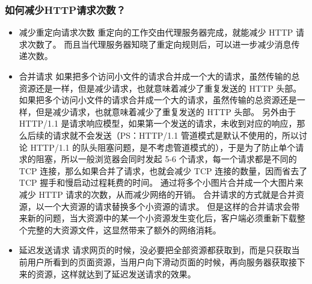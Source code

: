 \documentclass[11pt]{article}
\begin{document}
\subsubsection{如何减少HTTP请求次数？}
\label{sec:orgd9fa375}
\begin{itemize}
\item 减少重定向请求次数
重定向的工作交由代理服务器完成，就能减少 HTTP 请求次数了。
而且当代理服务器知晓了重定向规则后，可以进一步减少消息传递次数。
\item 合并请求
如果把多个访问小文件的请求合并成一个大的请求，虽然传输的总资源还是一样，但是减少请求，也就意味着减少了重复发送的 HTTP 头部。如果把多个访问小文件的请求合并成一个大的请求，虽然传输的总资源还是一样，但是减少请求，也就意味着减少了重复发送的 HTTP 头部。
另外由于 HTTP/1.1 是请求响应模型，如果第一个发送的请求，未收到对应的响应，那么后续的请求就不会发送（PS：HTTP/1.1 管道模式是默认不使用的，所以讨论 HTTP/1.1 的队头阻塞问题，是不考虑管道模式的），于是为了防止单个请求的阻塞，所以一般浏览器会同时发起 5-6 个请求，每一个请求都是不同的 TCP 连接，那么如果合并了请求，也就会减少 TCP 连接的数量，因而省去了 TCP 握手和慢启动过程耗费的时间。
通过将多个小图片合并成一个大图片来减少 HTTP 请求的次数，从而减少网络的开销。
合并请求的方式就是合并资源，以一个大资源的请求替换多个小资源的请求。
但是这样的合并请求会带来新的问题，当大资源中的某一个小资源发生变化后，客户端必须重新下载整个完整的大资源文件，这显然带来了额外的网络消耗。
\item 延迟发送请求
请求网页的时候，没必要把全部资源都获取到，而是只获取当前用户所看到的页面资源，当用户向下滑动页面的时候，再向服务器获取接下来的资源，这样就达到了延迟发送请求的效果。
\end{itemize}
\end{document}
